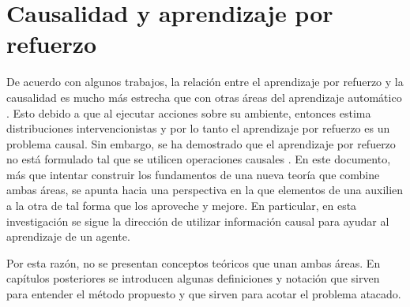




\section{Causalidad y aprendizaje por refuerzo}

De acuerdo con algunos trabajos, la relación entre el aprendizaje por refuerzo
y la causalidad es mucho más estrecha que con otras áreas del
aprendizaje automático \cite{schlkopf2019causality} \cite{Gershman2017}. Esto debido a que al ejecutar acciones sobre su ambiente, entonces
estima distribuciones intervencionistas y por lo tanto el aprendizaje por refuerzo es un problema causal. Sin embargo, se ha demostrado que el aprendizaje
por refuerzo no está formulado tal que se utilicen operaciones
causales \cite{gonzalezsoto2019reinforcement}.
En este documento, más que intentar construir los fundamentos de una nueva 
teoría que combine ambas áreas, se apunta hacia una perspectiva
en la que elementos de una auxilien a la otra de tal forma que
los aproveche y mejore. En particular, en esta investigación
se sigue la dirección de utilizar información causal para ayudar al 
aprendizaje de un agente.

Por esta razón, no se presentan conceptos teóricos que unan ambas áreas. 
En capítulos posteriores se introducen algunas definiciones y notación
que sirven para entender el método propuesto y que sirven para acotar el
problema atacado.
